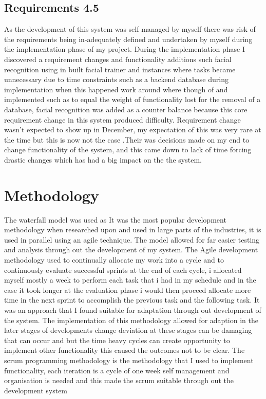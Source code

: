 \subsection{Requirements 4.5}
As the development of this system was self managed by myself there was risk of the requirements being in-adequately defined and undertaken by myself during the implementation phase of my project. During the implementation phase I discovered a requirement changes and functionality additions such facial recognition using in built facial trainer and instances where tasks became unnecessary due to time constraints such as a backend database during implementation when this happened work around where though of and implemented such as to equal the weight of functionality lost for the removal of a database, facial recognition was added as a counter balance because this core  requirement  change in this system produced  difficulty. Requirement change wasn't expected to show up in December, my expectation of this was very rare at the time but this is now not the case .Their was decisions made on my end to change functionality of the system, and this came down to lack of time forcing drastic changes which has had a big impact on the  the system. 
\section{Methodology}
The waterfall model was used as It was the most popular development methodology when researched upon and used in large parts of the industries,  it is used in parallel using an agile technique.  The model allowed for far easier testing  and analysis through out the development of my system. The Agile development methodology used to continually allocate my work into a cycle and to continuously evaluate successful sprints at the end of each cycle, i allocated myself mostly a week to perform each task that i had in my schedule and in the case it took longer at the evaluation phase i would then proceed allocate more time in the next sprint to accomplish the previous task and the following task.   It was an approach that I found  suitable  for adaptation through out development of the system. The implementation of this methodology allowed  for adaption in the later stages of developments change deviation at these stages can be damaging  that can occur and but the time heavy cycles can create opportunity to implement other functionality this caused the  outcomes not to be clear. The scrum programming  methodology is the methodology that I used to implement functionality, each iteration is a cycle of one week self management and organisation is needed and this made the scrum suitable through out the development system
  

